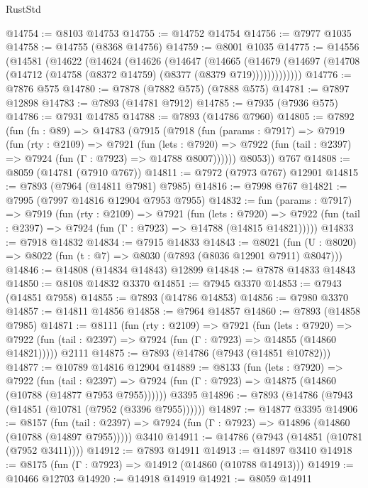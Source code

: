 \begin{lexlean}{RustStd}
\begin{coremodule}
{\begin{coremodule}
{{{{{{{{{{{{{{{{{{{{{{{{{{{{{{{{{{{{{{{{{{{{{{{{{{@14754 := @8103 @14753
@14755 := @14752 @14754
@14756 := @7977 @1035
@14758 := @14755 (@8368 @14756)
@14759 := @8001 @1035
@14775 := @14556
    (@14581
      (@14622
        (@14624
          (@14626
            (@14647
              (@14665
                (@14679
                  (@14697 (@14708 (@14712 (@14758 (@8372 @14759) (@8377 (@8379 @719)))))))))))))
@14776 := @7876 @575
@14780 := @7878 (@7882 @575) (@7888 @575)
@14781 := @7897 @12898
@14783 := @7893 (@14781 @7912)
@14785 := @7935 (@7936 @575)
@14786 := @7931 @14785
@14788 := @7893 (@14786 @7960)
@14805 := @7892
    (fun (fn : @89) =>
    @14783
      (@7915
        (@7918
          (fun (params : @7917) =>
          @7919
            (fun (rty : @2109) =>
            @7921
              (fun (lets : @7920) =>
              @7922 (fun (tail : @2397) => @7924 (fun (Γ : @7923) => @14788 @8007))))))
        @8053))
    @767
@14808 := @8059 (@14781 (@7910 @767))
@14811 := @7972 (@7973 @767) @12901
@14815 := @7893 (@7964 (@14811 @7981) @7985)
@14816 := @7998 @767
@14821 := @7995 (@7997 @14816 @12904 @7953 @7955)
@14832 := fun (params : @7917) =>
  @7919
    (fun (rty : @2109) =>
    @7921
      (fun (lets : @7920) =>
      @7922 (fun (tail : @2397) => @7924 (fun (Γ : @7923) => @14788 (@14815 @14821)))))
@14833 := @7918 @14832
@14834 := @7915 @14833
@14843 := @8021
    (fun (U : @8020) => @8022 (fun (t : @7) => @8030 (@7893 (@8036 @12901 @7911) @8047)))
@14846 := @14808 (@14834 @14843) @12899
@14848 := @7878 @14833 @14843
@14850 := @8108 @14832 @3370
@14851 := @7945 @3370
@14853 := @7943 (@14851 @7958)
@14855 := @7893 (@14786 @14853)
@14856 := @7980 @3370
@14857 := @14811 @14856
@14858 := @7964 @14857
@14860 := @7893 (@14858 @7985)
@14871 := @8111
    (fun (rty : @2109) =>
    @7921
      (fun (lets : @7920) =>
      @7922 (fun (tail : @2397) => @7924 (fun (Γ : @7923) => @14855 (@14860 @14821)))))
    @2111
@14875 := @7893 (@14786 (@7943 (@14851 @10782)))
@14877 := @10789 @14816 @12904
@14889 := @8133
    (fun (lets : @7920) =>
    @7922
      (fun (tail : @2397) =>
      @7924 (fun (Γ : @7923) => @14875 (@14860 (@10788 (@14877 @7953 @7955))))))
    @3395
@14896 := @7893 (@14786 (@7943 (@14851 (@10781 (@7952 (@3396 @7955))))))
@14897 := @14877 @3395
@14906 := @8157
    (fun (tail : @2397) => @7924 (fun (Γ : @7923) => @14896 (@14860 (@10788 (@14897 @7955)))))
    @3410
@14911 := @14786 (@7943 (@14851 (@10781 (@7952 @3411))))
@14912 := @7893 @14911
@14913 := @14897 @3410
@14918 := @8175 (fun (Γ : @7923) => @14912 (@14860 (@10788 @14913)))
@14919 := @10466 @12703
@14920 := @14918 @14919
@14921 := @8059 @14911
}}}}}}}}}}}}}}}}}}}}}}}}}}}}}}}}}}}}}}}}}}}}}}}}}}
\end{coremodule}}
\end{coremodule}
\end{lexlean}
